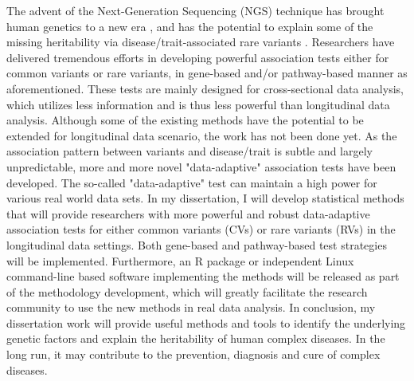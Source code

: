 \documentclass[12pt]{article}
\begin{document}
The advent of the Next-Generation Sequencing (NGS) technique has brought human genetics to a new era \cite{Ansorge2009,Metzker2009,Mardis2008,Shendure2008}, and has the potential to explain some of the missing heritability via disease/trait-associated rare variants \cite{Eichler2010}. Researchers have delivered tremendous efforts in developing powerful association tests either for common variants or rare variants, in gene-based and/or pathway-based manner as aforementioned. These tests are mainly designed for cross-sectional data analysis, which utilizes less information and is thus less powerful than longitudinal data analysis. Although some of the existing methods have the potential to be extended for longitudinal data scenario, the work has not been done yet.
As the association pattern between variants and disease/trait is subtle and largely unpredictable, more and more novel "data-adaptive" association tests have been developed. The so-called "data-adaptive" test can maintain a high power for various real world data sets. In my dissertation, I will develop statistical methods that will provide researchers with more powerful and robust data-adaptive association tests for either common variants (CVs) or rare variants (RVs) in the longitudinal data settings. Both gene-based and pathway-based test strategies will be implemented. Furthermore, an R package or independent Linux command-line based software implementing the methods will be released as part of the methodology development, which will greatly facilitate the research community to use the new methods in real data analysis. In conclusion, my dissertation work will provide useful methods and tools to identify the underlying genetic factors and explain the heritability of human complex diseases. In the long run, it may contribute to the prevention, diagnosis and cure of complex diseases.



\end{document}
